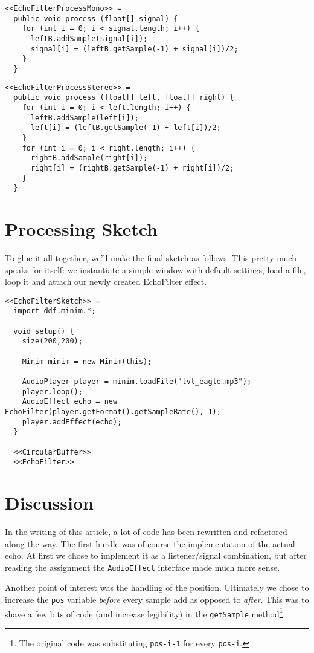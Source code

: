 \documentclass[11pt]{amsart}
\begin{document}
\begin{verbatim}
<<EchoFilterProcessMono>> = 
  public void process (float[] signal) {
    for (int i = 0; i < signal.length; i++) {
      leftB.addSample(signal[i]);
      signal[i] = (leftB.getSample(-1) + signal[i])/2;
    }
  }
\end{verbatim}
\begin{verbatim}
<<EchoFilterProcessStereo>> = 
  public void process (float[] left, float[] right) {
    for (int i = 0; i < left.length; i++) {
      leftB.addSample(left[i]);
      left[i] = (leftB.getSample(-1) + left[i])/2;
    }
    for (int i = 0; i < right.length; i++) {
      rightB.addSample(right[i]);
      right[i] = (rightB.getSample(-1) + right[i])/2;
    }
  }
\end{verbatim}

\section{Processing Sketch}
To glue it all together, we'll make the final sketch as follows. This pretty much speaks for itself: we instantiate a simple window with default settings, load a file, loop it and attach our newly created EchoFilter effect.

\begin{verbatim}
<<EchoFilterSketch>> = 
  import ddf.minim.*;

  void setup() {
    size(200,200);

    Minim minim = new Minim(this);
  
    AudioPlayer player = minim.loadFile("lvl_eagle.mp3");
    player.loop();
    AudioEffect echo = new EchoFilter(player.getFormat().getSampleRate(), 1);
    player.addEffect(echo);
  }

  <<CircularBuffer>>
  <<EchoFilter>>
\end{verbatim}

\section{Discussion}
In the writing of this article, a lot of code has been rewritten and refactored along the way. The first hurdle was of course the implementation of the actual echo. At first we chose to implement it as a listener/signal combination, but after reading the assignment the \texttt{AudioEffect} interface made much more sense.

Another point of interest was the handling of the position. Ultimately we chose to increase the \texttt{pos} variable \emph{before} every sample add as opposed to \emph{after}. This was to shave a few bits of code (and increase legibility) in the \texttt{getSample} method\footnote{The original code was substituting \texttt{pos-i-1} for every \texttt{pos-i}.}.
\end{document}
